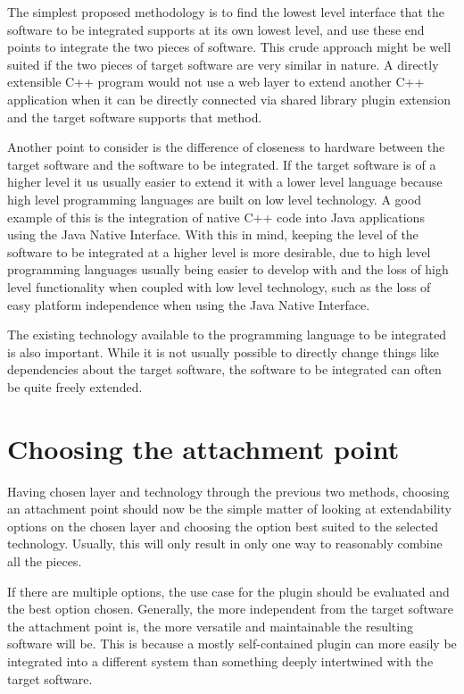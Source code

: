 \documentclass[BSA,Bachelor,english]{twbook}%
\begin{document}
The simplest proposed methodology is to find the lowest level interface that the software to be integrated supports at its own lowest level, and use these end points to integrate the two pieces of software. This crude approach might be well suited if the two pieces of target software are very similar in nature. A directly extensible C++ program would not use a web layer to extend another C++ application when it can be directly connected via shared library plugin extension and the target software supports that method.

Another point to consider is the difference of closeness to hardware between the target software and the software to be integrated. If the target software is of a higher level it us usually easier to extend it with a lower level language because high level programming languages are built on low level technology. A good example of this is the integration of native C++ code into Java applications using the Java Native Interface. With this in mind, keeping the level of the software to be integrated at a higher level is more desirable, due to high level programming languages usually being easier to develop with and the loss of high level functionality when coupled with low level technology, such as the loss of easy platform independence when using the Java Native Interface.

The existing technology available to the programming language to be integrated is also important. While it is not usually possible to directly change things like dependencies about the target software, the software to be integrated can often be quite freely extended.

\section{Choosing the attachment point}

Having chosen layer and technology through the previous two methods, choosing an attachment point should now be the simple matter of looking at extendability options on the chosen layer and choosing the option best suited to the selected technology. Usually, this will only result in only one way to reasonably combine all the pieces.

If there are multiple options, the use case for the plugin should be evaluated and the best option chosen. Generally, the more independent from the target software the attachment point is, the more versatile and maintainable the resulting software will be. This is because a mostly self-contained plugin can more easily be integrated into a different system than something deeply intertwined with the target software.
\end{document}
